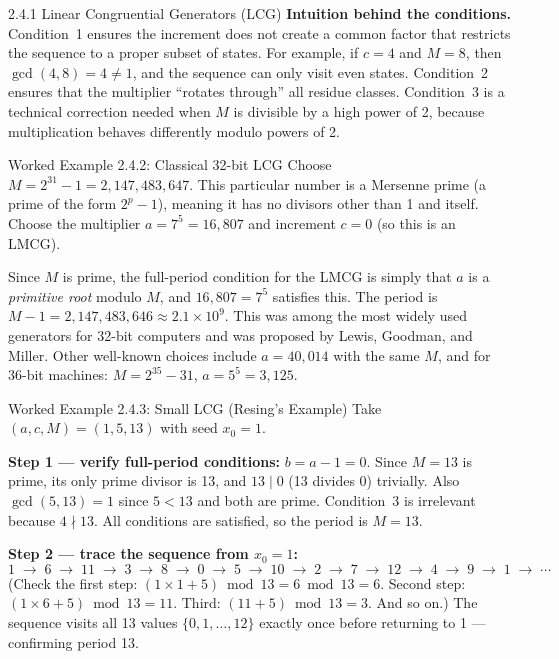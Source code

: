 \documentclass[aspectratio=169,10pt]{beamer}
\begin{document}
\begin{frame}[allowframebreaks]{2.4.1 Linear Congruential Generators (LCG)}
\textbf{Intuition behind the conditions.}
Condition~1 ensures the increment does not create a common factor that
restricts the sequence to a proper subset of states.  For example, if
$c = 4$ and $M = 8$, then $\gcd(4,8)=4 \ne 1$, and the sequence can only
visit even states.  Condition~2 ensures that the multiplier ``rotates
through'' all residue classes.  Condition~3 is a technical correction needed
when $M$ is divisible by a high power of 2, because multiplication behaves
differently modulo powers of 2.

\begin{exampleblock}{Worked Example 2.4.2: Classical 32-bit LCG}
Choose $M = 2^{31}-1 = 2{,}147{,}483{,}647$.  This particular number is a
Mersenne prime (a prime of the form $2^p - 1$), meaning it has no divisors
other than 1 and itself.  Choose the multiplier $a = 7^5 = 16{,}807$ and
increment $c = 0$ (so this is an LMCG).

Since $M$ is prime, the full-period condition for the LMCG is simply that
$a$ is a \emph{primitive root} modulo $M$, and $16{,}807 = 7^5$ satisfies
this.  The period is $M - 1 = 2{,}147{,}483{,}646 \approx 2.1 \times 10^9$.
This was among the most widely used generators for 32-bit computers and was
proposed by Lewis, Goodman, and Miller.  Other well-known choices include
$a = 40{,}014$ with the same $M$, and for 36-bit machines: $M = 2^{35}-31$,
$a = 5^5 = 3{,}125$.
\end{exampleblock}

\begin{exampleblock}{Worked Example 2.4.3: Small LCG (Resing's Example)}
Take $(a, c, M) = (1, 5, 13)$ with seed $x_0 = 1$.

\textbf{Step 1 --- verify full-period conditions:}
$b = a - 1 = 0$.  Since $M = 13$ is prime, its only prime divisor is 13,
and $13 \mid 0$ (13 divides 0) trivially.  Also $\gcd(5, 13) = 1$ since
$5 < 13$ and both are prime.  Condition~3 is irrelevant because $4 \nmid 13$.
All conditions are satisfied, so the period is $M = 13$.

\textbf{Step 2 --- trace the sequence from $x_0 = 1$:}
\[
  1 \;\to\; 6 \;\to\; 11 \;\to\; 3 \;\to\; 8 \;\to\; 0 \;\to\; 5
  \;\to\; 10 \;\to\; 2 \;\to\; 7 \;\to\; 12 \;\to\; 4 \;\to\; 9
  \;\to\; 1 \;\to\; \cdots
\]
(Check the first step: $(1 \times 1 + 5) \bmod 13 = 6 \bmod 13 = 6$.
Second step: $(1 \times 6 + 5) \bmod 13 = 11$. Third: $(11+5)\bmod 13 = 3$.
And so on.)  The sequence visits all 13 values $\{0, 1, \ldots, 12\}$
exactly once before returning to 1 --- confirming period 13.


\end{exampleblock}
\end{frame}
\end{document}
